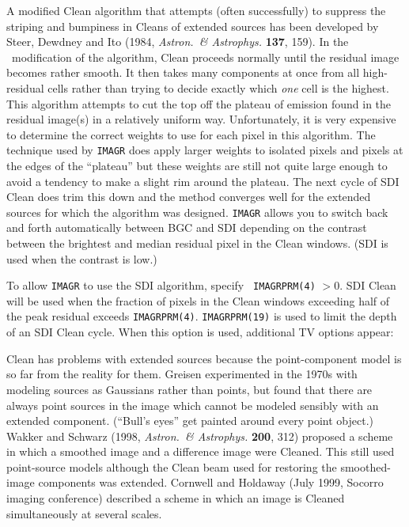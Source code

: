 
     A modified Clean algorithm that attempts (often successfully)
to suppress the striping and bumpiness in Cleans of extended sources
has been developed by Steer, Dewdney and Ito (1984, {\it Astron.~\&
Astrophys.} {\bf 137}, 159).  In the \AIPS\ modification of the
algorithm, Clean proceeds normally until the residual image becomes
rather smooth.  It then takes many components at once from all
high-residual cells rather than trying to decide exactly which {\it
one\/} cell is the highest.  This algorithm attempts to cut the top
off the plateau of emission found in the residual image(s) in a
relatively uniform way.  Unfortunately, it is very expensive to
determine the correct weights to use for each pixel in this algorithm.
The technique used by {\tt IMAGR} does apply larger weights to
isolated pixels and pixels at the edges of the ``plateau'' but these
weights are still not quite large enough to avoid a tendency to make a
slight rim around the plateau.  The next cycle of SDI Clean does trim
this down and the method converges well for the extended sources for
which the algorithm was designed.  {\tt IMAGR} allows you to switch
back and forth automatically between BGC and SDI depending on the
contrast between the brightest and median residual pixel in the Clean
windows. (SDI is used when the contrast is low.)

     To allow {\tt IMAGR} to use the SDI algorithm, specify {\tt
IMAGRPRM(4)} $> 0$.  SDI Clean will be used when the fraction of
pixels in the Clean windows exceeding half of the peak residual
exceeds {\tt IMAGRPRM(4)}\@.  {\tt IMAGRPRM(19)} is used to limit the
depth of an SDI Clean cycle.  When this option is used, additional
TV options appear:


     Clean has problems with extended sources because the
point-component model is so far from the reality for them.  Greisen
experimented in the 1970s with modeling sources as Gaussians rather
than points, but found that there are always point sources in the
image which cannot be modeled sensibly with an extended component.
(``Bull's eyes'' get painted around every point object.)     Wakker
and Schwarz (1998, {\it Astron.~\& Astrophys.} {\bf 200}, 312)
proposed a scheme in which a smoothed image and a difference image
were Cleaned.  This still used point-source models although the Clean
beam used for restoring the smoothed-image components was extended.
Cornwell and Holdaway (July 1999, Socorro imaging conference)
described a scheme in which an image is Cleaned simultaneously at
several scales.

